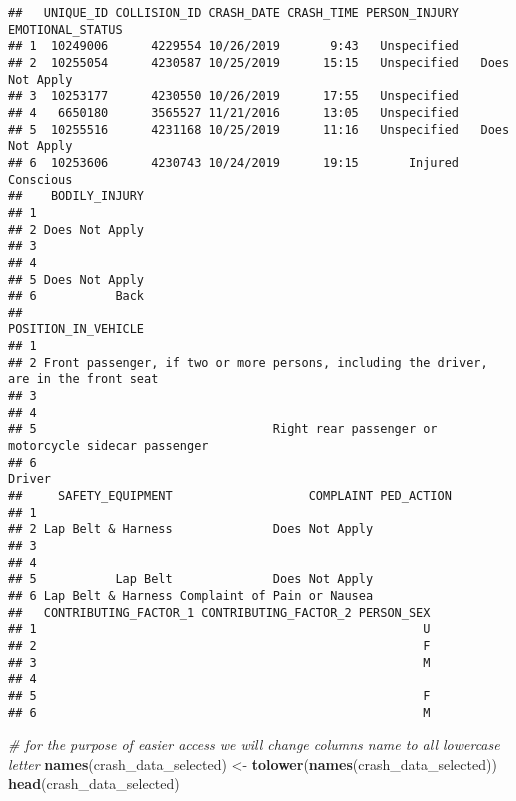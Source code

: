 \documentclass[
]{article}
\newenvironment{Shaded}{\begin{snugshade}}{\end{snugshade}}
\newcommand{\CommentTok}[1]{\textcolor[rgb]{0.56,0.35,0.01}{\textit{#1}}}
\newcommand{\FunctionTok}[1]{\textcolor[rgb]{0.13,0.29,0.53}{\textbf{#1}}}
\newcommand{\NormalTok}[1]{#1}
\newcommand{\OtherTok}[1]{\textcolor[rgb]{0.56,0.35,0.01}{#1}}
\begin{document}
\begin{verbatim}
##   UNIQUE_ID COLLISION_ID CRASH_DATE CRASH_TIME PERSON_INJURY EMOTIONAL_STATUS
## 1  10249006      4229554 10/26/2019       9:43   Unspecified                 
## 2  10255054      4230587 10/25/2019      15:15   Unspecified   Does Not Apply
## 3  10253177      4230550 10/26/2019      17:55   Unspecified                 
## 4   6650180      3565527 11/21/2016      13:05   Unspecified                 
## 5  10255516      4231168 10/25/2019      11:16   Unspecified   Does Not Apply
## 6  10253606      4230743 10/24/2019      19:15       Injured        Conscious
##    BODILY_INJURY
## 1               
## 2 Does Not Apply
## 3               
## 4               
## 5 Does Not Apply
## 6           Back
##                                                                    POSITION_IN_VEHICLE
## 1                                                                                     
## 2 Front passenger, if two or more persons, including the driver, are in the front seat
## 3                                                                                     
## 4                                                                                     
## 5                                 Right rear passenger or motorcycle sidecar passenger
## 6                                                                               Driver
##     SAFETY_EQUIPMENT                   COMPLAINT PED_ACTION
## 1                                                          
## 2 Lap Belt & Harness              Does Not Apply           
## 3                                                          
## 4                                                          
## 5           Lap Belt              Does Not Apply           
## 6 Lap Belt & Harness Complaint of Pain or Nausea           
##   CONTRIBUTING_FACTOR_1 CONTRIBUTING_FACTOR_2 PERSON_SEX
## 1                                                      U
## 2                                                      F
## 3                                                      M
## 4                                                       
## 5                                                      F
## 6                                                      M
\end{verbatim}

\begin{Shaded}
\begin{Highlighting}[]
\CommentTok{\# for the purpose of easier access we will change columns name to all lowercase letter}
\FunctionTok{names}\NormalTok{(crash\_data\_selected) }\OtherTok{\textless{}{-}} \FunctionTok{tolower}\NormalTok{(}\FunctionTok{names}\NormalTok{(crash\_data\_selected))}
\FunctionTok{head}\NormalTok{(crash\_data\_selected)}
\end{Highlighting}
\end{Shaded}
\end{document}
